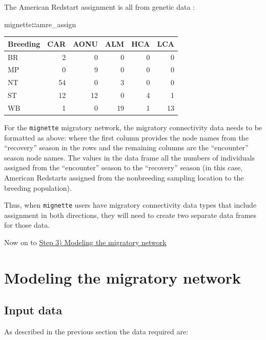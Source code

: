 \documentclass[
]{book}
\newenvironment{Shaded}{\begin{snugshade}}{\end{snugshade}}
\newcommand{\NormalTok}[1]{#1}
\newcommand{\SpecialCharTok}[1]{\textcolor[rgb]{0.81,0.36,0.00}{\textbf{#1}}}
\begin{document}
The American Redstart assignment is all from genetic data \citep{desaix2023low}:

\begin{Shaded}
\begin{Highlighting}[]
\NormalTok{mignette}\SpecialCharTok{::}\NormalTok{amre\_assign}
\end{Highlighting}
\end{Shaded}

\begin{tabular}{l|r|r|r|r|r}
\hline
Breeding & CAR & AONU & ALM & HCA & LCA\\
\hline
BR & 2 & 0 & 0 & 0 & 0\\
\hline
MP & 0 & 9 & 0 & 0 & 0\\
\hline
NT & 54 & 0 & 3 & 0 & 0\\
\hline
ST & 12 & 12 & 0 & 4 & 1\\
\hline
WB & 1 & 0 & 19 & 1 & 13\\
\hline
\end{tabular}

For the \texttt{mignette} migratory network, the migratory connectivity data needs to be formatted as above: where the first column provides the node names from the ``recovery'' season in the rows and the remaining columns are the ``encounter'' season node names. The values in the data frame all the numbers of individuals assigned from the ``encounter'' season to the ``recovery'' season (in this case, American Redstarts assigned from the nonbreeding sampling location to the breeding population).

Thus, when \texttt{mignette} users have migratory connectivity data types that include assignment in both directions, they will need to create two separate data frames for those data.

Now on to \protect\hyperlink{model}{Step 3) Modeling the migratory network}

\hypertarget{model}{%
\chapter{Modeling the migratory network}\label{model}}

\hypertarget{input-data}{%
\section{Input data}\label{input-data}}

As described in the previous section the data required are:
\end{document}
